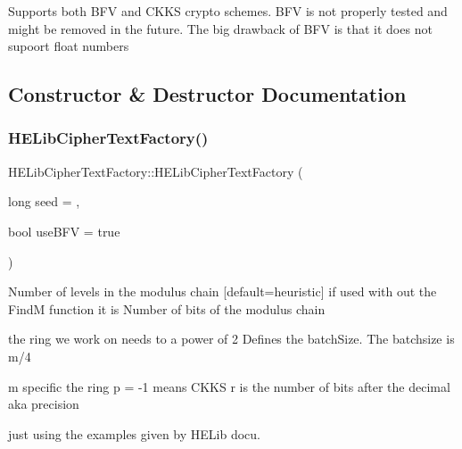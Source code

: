 Supports both B\+FV and C\+K\+KS crypto schemes. B\+FV is not properly tested and might be removed in the future. The big drawback of B\+FV is that it does not supoort float numbers 

\subsection{Constructor \& Destructor Documentation}
\mbox{\label{classHELibCipherTextFactory_a097caa3314d257038989d27258cc9daf}} 
\subsubsection{\texorpdfstring{H\+E\+Lib\+Cipher\+Text\+Factory()}{HELibCipherTextFactory()}\hspace{0.1cm}{\footnotesize\ttfamily [1/2]}}
{\footnotesize\ttfamily H\+E\+Lib\+Cipher\+Text\+Factory\+::\+H\+E\+Lib\+Cipher\+Text\+Factory (\begin{DoxyParamCaption}\item[{long}]{seed = {},  }\item[{bool}]{use\+B\+FV = {\ttfamily true} }\end{DoxyParamCaption})\hspace{0.3cm}{\ttfamily [inline]}}

Number of levels in the modulus chain \mbox{[}default=heuristic\mbox{]} if used with out the FindM function it is Number of bits of the modulus chain

the ring we work on needs to a power of 2 Defines the batch\+Size. The batchsize is m/4

m specific the ring p = -\/1 means C\+K\+KS r is the number of bits after the decimal aka precision

just using the examples given by H\+E\+Lib docu. \mbox{\label{classHELibCipherTextFactory_a725b27d7e0a60a6d2a9af33678f657be}} 
